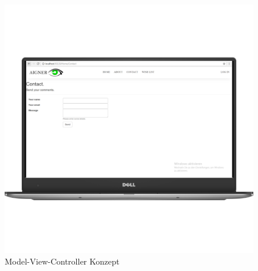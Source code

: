 \begin{figure}[H]
\begin{center}
	\includegraphics[scale=.2]{images/Contact.png}
\end{center}
	\caption{Model-View-Controller Konzept}
	\label{fig:sample}
\end{figure}



